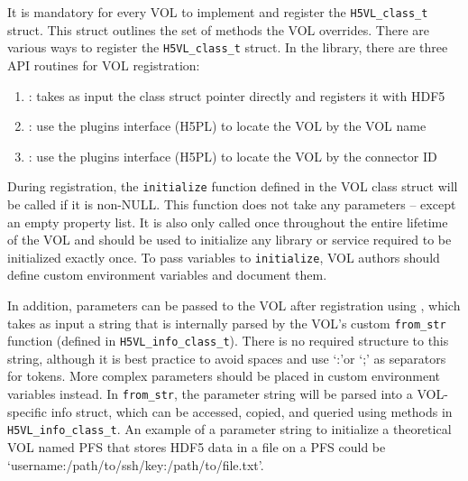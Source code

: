 It is mandatory for every VOL to implement and register the \texttt{H5VL\_class\_t} struct. This struct outlines the set of methods the VOL overrides. There are various ways to register the \texttt{H5VL\_class\_t} struct. In the library, there are three API routines for VOL registration:
\begin{enumerate}
    \item {}: takes as input the class struct pointer directly and registers it with HDF5
    \item {}: use the plugins interface (H5PL) to locate the VOL by the VOL name
    \item {}: use the plugins interface (H5PL) to locate the VOL by the connector ID
\end{enumerate}
During registration, the \texttt{initialize} function defined in the VOL class struct will be called if it is non-NULL. This function does not take any parameters -- except an empty property list. It is also only called once throughout the entire lifetime of the VOL and should be used to initialize any library or service required to be initialized exactly once. To pass variables to \texttt{initialize}, VOL authors should define custom environment variables and document them.

In addition, parameters can be passed to the VOL after registration using , which takes as input a string that is internally parsed by the VOL's custom \texttt{from\_str} function (defined in \texttt{H5VL\_info\_class\_t}). There is no required structure to this string, although it is best practice to avoid spaces and use `:'or `;' as separators for tokens. More complex parameters should be placed in custom environment variables instead. In \texttt{from\_str}, the parameter string will be parsed into a VOL-specific info struct, which can be accessed, copied, and queried using methods in \texttt{H5VL\_info\_class\_t}. An example of a parameter string to initialize a theoretical VOL named PFS that stores HDF5 data in a file on a PFS could be `username:/path/to/ssh/key:/path/to/file.txt'.

